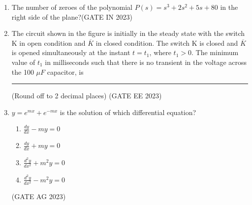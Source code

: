 \begin{enumerate}[label=\thechapter.\arabic*,ref=\thechapter.\theenumi]

\item The number of zeroes of the polynomial $P(s) = s^3+2s^2+5s+80$ in the right side of the plane?\hfill(GATE IN 2023) \\

\solution

\newpage

\item The circuit shown in the figure is initially in the steady state with the switch K in open condition and $\overline{K}$ in closed condition. The switch K is closed and $\overline{K}$ is opened simultaneously at the instant $t = t_1$, where $t_1 > 0$. The minimum value of $t_1$ in milliseconds such that there is no transient in the voltage across the 100 $\mu F$ capacitor, is \rule{1cm}{0.15mm} (Round off to 2 decimal places) \hfill (GATE EE 2023)


\newpage
\item $y=e^{mx}+e^{-mx}$ is the solution of which differential equation?
\begin{enumerate}[label=\textbf{\arabic*.}, font=\bfseries, align=left]
    \item $\frac{dy}{dx} - my = 0$ 
    \item $\frac{dy}{dx} + my = 0$ 
    \item $\frac{d^{2}y}{dx^{2}} + m^{2}y = 0$ 
    \item $\frac{d^{2}y}{dx^{2}} - m^{2}y = 0$ 
\end{enumerate} \hfill(GATE AG 2023)
\solution
\end{enumerate}

